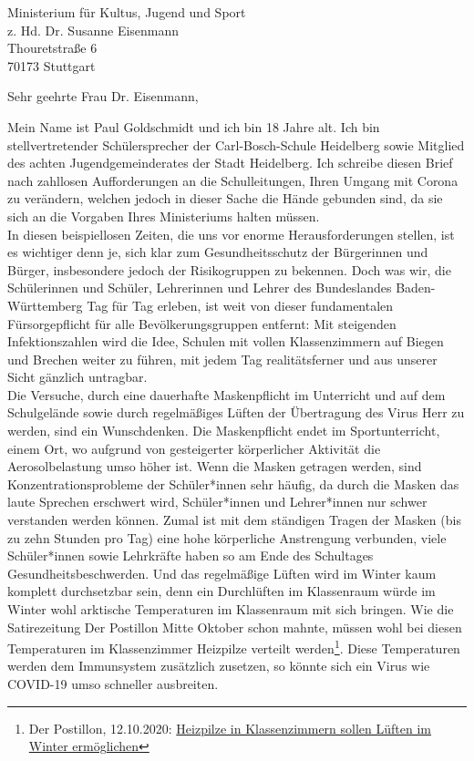 \documentclass[
	fontsize=12pt,
	parskip=full,
	paper=A4,	
	fromalign=right,
	fromemail=true,
	version=last,
]{scrlttr2}
\begin{document}
\begin{letter}{
	Ministerium für Kultus, Jugend und Sport\\
	z. Hd. Dr. Susanne Eisenmann\\
	Thouretstraße 6\\
	70173 Stuttgart 
}
	
\opening{Sehr geehrte Frau Dr. Eisenmann,}

Mein Name ist Paul Goldschmidt und ich bin 18 Jahre alt. Ich bin stellvertretender Schülersprecher der Carl-Bosch-Schule Heidelberg sowie Mitglied des achten Jugendgemeinderates der Stadt Heidelberg. Ich schreibe diesen Brief nach zahllosen Aufforderungen an die Schulleitungen, Ihren Umgang mit Corona zu verändern, welchen jedoch in dieser Sache die Hände gebunden sind, da sie sich an die Vorgaben Ihres Ministeriums halten müssen.\\
In diesen beispiellosen Zeiten, die uns vor enorme Herausforderungen stellen, ist es wichtiger denn je, sich klar zum Gesundheitsschutz der Bürgerinnen und Bürger, insbesondere jedoch der Risikogruppen zu bekennen. Doch was wir, die Schülerinnen und Schüler, Lehrerinnen und Lehrer des Bundeslandes Baden-Württemberg Tag für Tag erleben, ist weit von dieser fundamentalen Fürsorgepflicht für alle Bevölkerungsgruppen entfernt: Mit steigenden Infektionszahlen wird die Idee, Schulen mit vollen Klassenzimmern auf Biegen und Brechen weiter zu führen, mit jedem Tag realitätsferner und aus unserer Sicht gänzlich untragbar. \\
Die Versuche, durch eine dauerhafte Maskenpflicht im Unterricht und auf dem Schulgelände sowie durch regelmäßiges Lüften der Übertragung des Virus Herr zu werden, sind ein Wunschdenken. Die Maskenpflicht endet im Sportunterricht, einem Ort, wo aufgrund von gesteigerter körperlicher Aktivität die Aerosolbelastung umso höher ist. Wenn die Masken getragen werden, sind Konzentrationsprobleme der Schüler*innen sehr häufig, da durch die Masken das laute Sprechen erschwert wird, Schüler*innen und Lehrer*innen nur schwer verstanden werden können. Zumal ist mit dem ständigen Tragen der Masken (bis zu zehn Stunden pro Tag) eine hohe körperliche Anstrengung verbunden, viele Schüler*innen sowie Lehrkräfte haben so am Ende des Schultages Gesundheitsbeschwerden. Und das regelmäßige Lüften wird im Winter kaum komplett durchsetzbar sein, denn ein Durchlüften im Klassenraum würde im Winter wohl arktische Temperaturen im Klassenraum mit sich bringen. Wie die Satirezeitung \glqq Der Postillon\grqq{} Mitte Oktober schon mahnte, müssen wohl bei diesen Temperaturen im Klassenzimmer Heizpilze verteilt werden\footnote{Der Postillon, 12.10.2020: \glqq \href{https://www.der-postillon.com/2020/10/heizpilze.html}{\color{blue}Heizpilze in Klassenzimmern sollen Lüften im Winter ermöglichen\grqq}}. Diese Temperaturen werden dem Immunsystem zusätzlich zusetzen, so könnte sich ein Virus wie COVID-19 umso schneller ausbreiten. \\


\end{letter}
\end{document}
